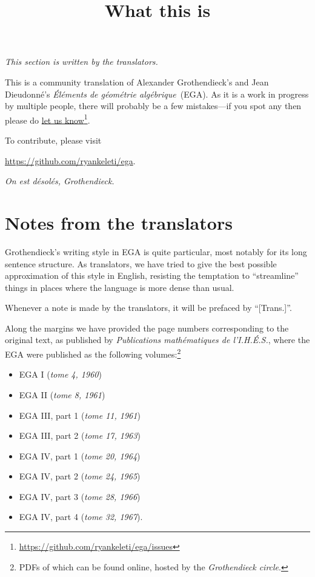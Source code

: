 


\title{What this is}
\maketitle

\label{section:phantom}

\noindent
\emph{This section is written by the translators.}

\noindent
This is a community translation of Alexander Grothendieck's and Jean Dieudonn\'e's \emph{\'El\'ements de g\'eom\'etrie alg\'ebrique}~(EGA).
As it is a work in progress by multiple people, there will probably be a few mistakes---if you spot any then please do \href{https://github.com/ryankeleti/ega/issues}{let us know}\footnote{\url{https://github.com/ryankeleti/ega/issues}}.

\noindent
To contribute, please visit
\begin{center}
  \url{https://github.com/ryankeleti/ega}.
\end{center}

\noindent
\emph{On est d\'esol\'es, Grothendieck.}

\section*{\textbf{Notes from the translators}}
Grothendieck's writing style in EGA is quite particular, most notably for its long sentence structure.
As translators, we have tried to give the best possible approximation of this style in English, resisting the temptation to ``streamline'' things in places where the language is more dense than usual.

\sectionbreak

Whenever a note is made by the translators, it will be prefaced by ``[Trans.]''.

\sectionbreak

Along the margins we have provided the page numbers corresponding to the original text, as published by \emph{Publications mathématiques de l'I.H.É.S.}, where the EGA were published as the following volumes:\footnote{PDFs of which can be found online, hosted by the \emph{Grothendieck circle}.}
\begin{itemize}
    \item EGA I (\emph{tome 4, 1960})
    \item EGA II (\emph{tome 8, 1961})
    \item EGA III, part 1 (\emph{tome 11, 1961})
    \item EGA III, part 2 (\emph{tome 17, 1963})
    \item EGA IV, part 1 (\emph{tome 20, 1964})
    \item EGA IV, part 2 (\emph{tome 24, 1965})
    \item EGA IV, part 3 (\emph{tome 28, 1966})
    \item EGA IV, part 4 (\emph{tome 32, 1967}).
\end{itemize}


